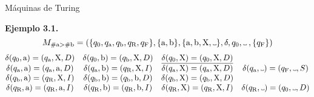 \documentclass[10pt,xcolor=dvipsnames,aspectratio=169,spanish]{beamer}
\newcommand\Vtextvisiblespace[1][.3em]{%
\mbox{\kern.06em\vrule height.3ex}%
\vbox{\hrule width#1}%
\hbox{\vrule height.3ex}}
\begin{document}
\begin{frame}{Máquinas de Turing}

\textbf{Ejemplo 3.1}\textbf{.}
$$
    M_{\#\text{a}>\#\text{b}}=(\{q_0, q_\text{a}, q_\text{b}, q_\text{R}, q_\text{F}\}, \{\text{a}, \text{b}\}, \{\text{a}, \text{b}, \text{X}, \Vtextvisiblespace\}, \delta, q_0, \Vtextvisiblespace\:,\{q_\text{F}\})
$$
$$
    \begin{matrix}
        \delta(q_0, \text{a}) = (q_\text{a},\text{X},D) & \delta(q_0, \text{b}) = (q_\text{b},\text{X},D) & \underline{\delta(q_0, \text{X}) = (q_0,\text{X},D)} &  \\
        \delta(q_\text{a}, \text{a}) = (q_\text{a},\text{a},D) & \delta(q_\text{a}, \text{b}) = (q_\text{R},\text{X},I) & \delta(q_\text{a}, \text{X}) = (q_\text{a},\text{X},D) & \delta(q_\text{a}, \Vtextvisiblespace) = (q_\text{F},\Vtextvisiblespace,S) \\
        \delta(q_\text{b}, \text{a}) = (q_\text{R},\text{X},I) & \delta(q_\text{b}, \text{b}) = (q_\text{b},\text{b},D) & \delta(q_\text{b}, \text{X}) = (q_\text{b},\text{X},D) &  \\
        \delta(q_\text{R}, \text{a}) = (q_\text{R},\text{a},I) & \delta(q_\text{R}, \text{b}) = (q_\text{R},\text{b},I) & \delta(q_\text{R}, \text{X}) = (q_\text{R},\text{X},I) & \delta(q_\text{R}, \Vtextvisiblespace) = (q_0,\Vtextvisiblespace,D) \\
    \end{matrix}
$$

\vspace{5mm}

\begin{adjustbox}{max height={.67\textheight},center}

\end{adjustbox}

\end{frame}
\end{document}
